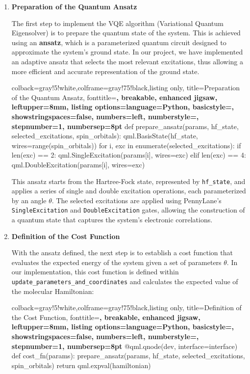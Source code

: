 \begin{enumerate}
  \item \textbf{Preparation of the Quantum Ansatz}
  
  The first step to implement the VQE algorithm (Variational Quantum Eigensolver) is to prepare the quantum state of the system. This is achieved using an \textbf{ansatz}, which is a parameterized quantum circuit designed to approximate the system's ground state. In our project, we have implemented an adaptive ansatz that selects the most relevant excitations, thus allowing a more efficient and accurate representation of the ground state.
  
  \begin{tcblisting}{colback=gray!5!white,colframe=gray!75!black,listing only,
    title=Preparation of the Quantum Ansatz, fonttitle=\bfseries, breakable, enhanced jigsaw, leftupper=8mm,
    listing options={language=Python, basicstyle=\ttfamily\small,
    showstringspaces=false, numbers=left, numberstyle=\footnotesize, stepnumber=1, numbersep=8pt}}
def prepare_ansatz(params, hf_state, selected_excitations, 
spin_orbitals):
    qml.BasisState(hf_state, wires=range(spin_orbitals))
    for i, exc in enumerate(selected_excitations):
        if len(exc) == 2:
            qml.SingleExcitation(params[i], wires=exc)
        elif len(exc) == 4:
            qml.DoubleExcitation(params[i], wires=exc)
  \end{tcblisting}
  
  This ansatz starts from the Hartree-Fock state, represented by \texttt{hf\_state}, and applies a series of single and double excitation operations, each parameterized by an angle \(\theta\). The selected excitations are applied using PennyLane's \texttt{SingleExcitation} and \texttt{DoubleExcitation} gates, allowing the construction of a quantum state that captures the system's electronic correlations.
  
  \item \textbf{Definition of the Cost Function}
  
  With the ansatz defined, the next step is to establish a cost function that evaluates the expected energy of the system given a set of parameters \(\theta\). In our implementation, this cost function is defined within \texttt{update\_parameters\_and\_coordinates} and calculates the expected value of the molecular Hamiltonian:
  
  \begin{tcblisting}{colback=gray!5!white,colframe=gray!75!black,listing only,
    title=Definition of the Cost Function, fonttitle=\bfseries, breakable, enhanced jigsaw, leftupper=8mm,
    listing options={language=Python, basicstyle=\ttfamily\small,
    showstringspaces=false, numbers=left, numberstyle=\footnotesize, stepnumber=1, numbersep=8pt}}
@qml.qnode(dev, interface=interface)
def cost_fn(params):
    prepare_ansatz(params, hf_state, selected_excitations, spin_orbitals)
    return qml.expval(hamiltonian)
  \end{tcblisting}
  

\end{enumerate}
